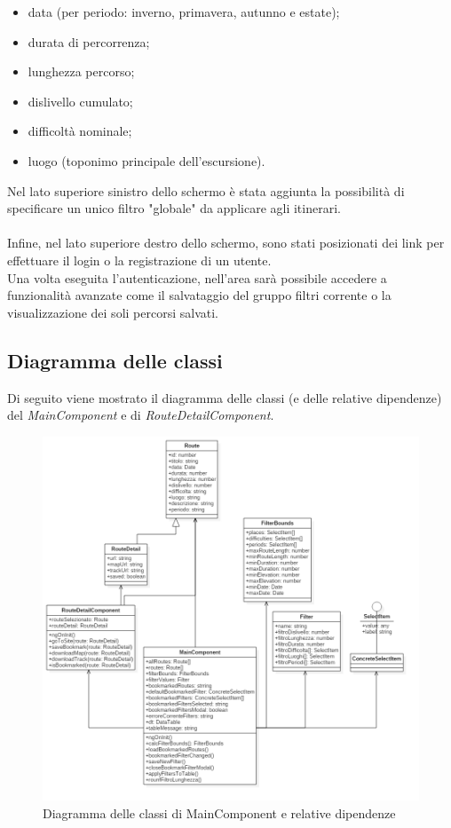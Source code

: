 \documentclass[11pt]{report}
\begin{document}
\begin{itemize}
	\item data (per periodo: inverno, primavera, autunno e estate);
	\item durata di percorrenza;
	\item lunghezza percorso;
	\item dislivello cumulato;
	\item difficoltà nominale;
	\item luogo (toponimo principale dell'escursione).
\end{itemize}
Nel lato superiore sinistro dello schermo è stata aggiunta la possibilità di specificare un unico filtro "globale" da applicare agli itinerari.
\\\\Infine, nel lato superiore destro dello schermo, sono stati posizionati dei link per effettuare il login o la registrazione di un utente.
\\Una volta eseguita l'autenticazione, nell'area sarà possibile accedere a funzionalità avanzate come il salvataggio del gruppo filtri corrente o la visualizzazione dei soli percorsi salvati.
\pagebreak
\subsection{Diagramma delle classi}
Di seguito viene mostrato il diagramma delle classi (e delle relative dipendenze) del \textit{MainComponent} e di \textit{RouteDetailComponent}.
\begin{figure}[h]
	\centering
	\includegraphics[scale=0.45]{ClassDiagram_Frontend}
	\caption{Diagramma delle classi di MainComponent e relative dipendenze \label{ClassDiagram_Frontend}}
\end{figure}
\pagebreak
\end{document}
